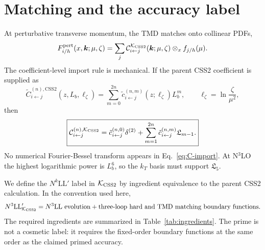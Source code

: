 \documentclass[aps,prd,preprint,superscriptaddress,nofootinbib,longbibliography]{revtex4-2}
\newcommand{\bk}{\bm k}
\newcommand{\KCSS}{\mathcal K_{\rm CSS2}}
\newcommand{\CSS}{\mathrm{CSS2}}
\newcommand{\ox}{\otimes_x}
\newcommand{\deltaT}{\delta^{(2)}}
\newcommand{\pert}{\mathrm{pert}}
\newcommand{\NthreeLLp}{N^3\mathrm{LL}'}
\newcommand{\tilC}{\widetilde C}
\begin{document}
\section{Matching and the accuracy label}

At perturbative transverse momentum, the TMD matches onto collinear PDFs,
\begin{equation}
  F_{i/h}^{\pert}(x,\bk;\mu,\zeta)
  =\sum_j \mathcal C_{i\leftarrow j}^{\KCSS}(\bk;\mu,\zeta)\ox f_{j/h}(\mu).
  \label{eq:TMDmatching}
\end{equation}
The coefficient-level import rule is mechanical.  If the parent CSS2 coefficient is supplied as
\begin{equation}
  \tilC_{i\leftarrow j}^{(n),\CSS}(z,L_b,\ell_\zeta)
  =\sum_{m=0}^{2n}\tilde c_{i\leftarrow j}^{(n,m)}(z;\ell_\zeta)L_b^m,
  \qquad
  \ell_\zeta=\ln\frac{\zeta}{\mu^2},
\end{equation}
then
\begin{equation}
  \boxed{
  \mathcal C_{i\leftarrow j}^{(n),\KCSS}
  =\tilde c_{i\leftarrow j}^{(n,0)}\deltaT
  +\sum_{m=1}^{2n}\tilde c_{i\leftarrow j}^{(n,m)}\mathfrak L_{m-1}.}
  \label{eq:C-import}
\end{equation}
No numerical Fourier-Bessel transform appears in Eq.~\eqref{eq:C-import}.  At N$^3$LO the highest logarithmic power is $L_b^6$, so the $k_T$ basis must support $\mathfrak L_5$.

We define the $N^k\mathrm{LL}'$ label in $\KCSS$ by ingredient equivalence to the parent CSS2 calculation.  In the convention used here,
\begin{equation}
  \NthreeLLp_{\KCSS}
  =N^3\mathrm{LL}\ \text{evolution}
  +\text{three-loop hard and TMD matching boundary functions}.
\end{equation}
The required ingredients are summarized in Table~\ref{tab:ingredients}.  The prime is not a cosmetic label: it requires the fixed-order boundary functions at the same order as the claimed primed accuracy.
\end{document}
